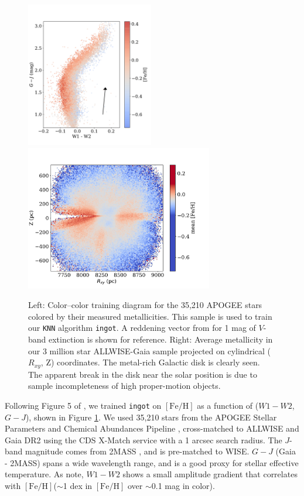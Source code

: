 \documentclass[modern]{rnaastex}
\newcommand{\ingot}{{\tt ingot}\xspace} %
\newcommand{\feh}{$[\mathrm{Fe}/\mathrm{H}]$\xspace}
\begin{document}
\begin{figure}
\centering
\includegraphics[height=2.5in]{color_color}
\includegraphics[height=2.5in]{RZ1}
\caption{
Left: Color--color training diagram for the 35,210 APOGEE stars colored by their measured metallicities. This sample is used to train our {\tt KNN} algorithm \ingot. A reddening vector from \citet{sanders18} for 1 mag of $V$-band extinction is shown for reference.
Right: Average metallicity in our 3 million star ALLWISE-Gaia sample projected on cylindrical  ($R_{xy}$, Z) coordinates. The metal-rich Galactic disk is clearly seen. The apparent break in the disk near the solar position is due to sample incompleteness of high proper-motion objects.
\label{fig:1}}
\end{figure}

Following Figure 5 of \citet{schmidt16}, we trained \ingot on \feh as a function of ($W1-W2$, $G-J$), shown in Figure \ref{fig:1}. We used 35,210 stars from the APOGEE Stellar Parameters and Chemical Abundances Pipeline \citep[ASCAP,][]{garcia-perez2016}, cross-matched to ALLWISE \citep{mainzer2014} and Gaia DR2 using the CDS X-Match service with a 1 arcsec search radius. The $J$-band magnitude comes from 2MASS \citep{2mass}, and is pre-matched to WISE. $G-J$ (Gaia - 2MASS) spans a wide wavelength range, and is a good proxy for stellar effective temperature. As \citet{schmidt16} note, $W1-W2$ shows a small amplitude gradient that correlates with \feh ($\sim$1 dex in \feh over $\sim$0.1 mag in color).
\end{document}
